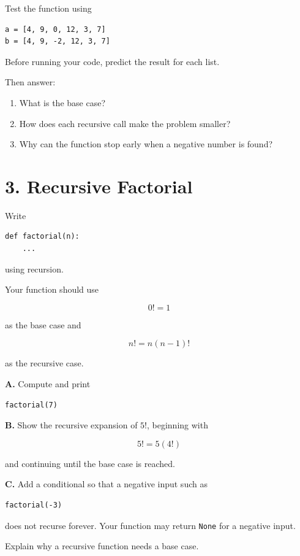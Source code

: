 \documentclass[11pt]{article}
\begin{document}
Test the function using

\begin{lstlisting}
a = [4, 9, 0, 12, 3, 7]
b = [4, 9, -2, 12, 3, 7]
\end{lstlisting}

Before running your code, predict the result for each list.

Then answer:

\begin{enumerate}
\item What is the base case?
\item How does each recursive call make the problem smaller?
\item Why can the function stop early when a negative number is found?
\end{enumerate}

\section*{3. Recursive Factorial}

Write

\begin{lstlisting}
def factorial(n):
    ...
\end{lstlisting}

using recursion.

Your function should use

\[
0! = 1
\]

as the base case and

\[
n! = n(n-1)!
\]

as the recursive case.

\textbf{A.} Compute and print

\begin{lstlisting}
factorial(7)
\end{lstlisting}

\textbf{B.} Show the recursive expansion of \(5!\), beginning with

\[
5! = 5(4!)
\]

and continuing until the base case is reached.

\textbf{C.} Add a conditional so that a negative input such as

\begin{lstlisting}
factorial(-3)
\end{lstlisting}

does not recurse forever. Your function may return \texttt{None} for a
negative input.

Explain why a recursive function needs a base case.
\end{document}
